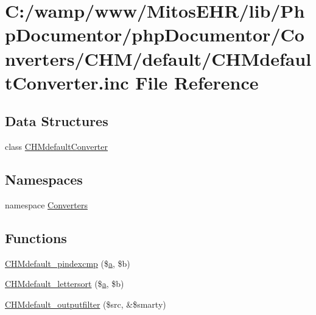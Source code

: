 \hypertarget{_c_h_mdefault_converter_8inc}{\section{\-C\-:/wamp/www/\-Mitos\-E\-H\-R/lib/\-Php\-Documentor/php\-Documentor/\-Converters/\-C\-H\-M/default/\-C\-H\-Mdefault\-Converter.inc \-File \-Reference}
\label{_c_h_mdefault_converter_8inc}
}
\subsection*{\-Data \-Structures}
\begin{DoxyCompactItemize}
\item 
class \hyperlink{class_c_h_mdefault_converter}{\-C\-H\-Mdefault\-Converter}
\end{DoxyCompactItemize}
\subsection*{\-Namespaces}
\begin{DoxyCompactItemize}
\item 
namespace \hyperlink{namespace_converters}{\-Converters}
\end{DoxyCompactItemize}
\subsection*{\-Functions}
\begin{DoxyCompactItemize}
\item 
\hyperlink{_c_h_mdefault_converter_8inc_a683dd0f4f29a5471b25e43539ad88217}{\-C\-H\-Mdefault\-\_\-pindexcmp} (\$\hyperlink{classa}{a}, \$b)
\item 
\hyperlink{_c_h_mdefault_converter_8inc_aa32d30dc7765ed641fc3063af874be34}{\-C\-H\-Mdefault\-\_\-lettersort} (\$\hyperlink{classa}{a}, \$b)
\item 
\hyperlink{_c_h_mdefault_converter_8inc_a34b14038c769623b03291a8a921d4ecb}{\-C\-H\-Mdefault\-\_\-outputfilter} (\$src, \&\$smarty)
\end{DoxyCompactItemize}


